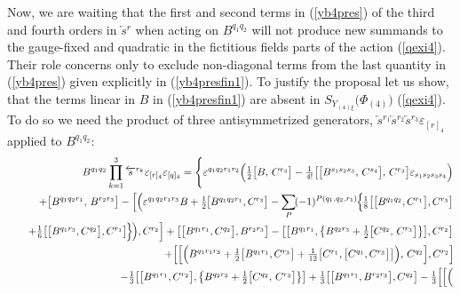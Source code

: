 \documentclass[10pt]{article}
\begin{document}
Now, we are waiting that the first and second terms  in (\ref{yb4pres}) of the  third and fourth orders in $\overleftarrow{s}{}^r$ when acting on $B^{q_1q_2}$  will not  produce new summands to the gauge-fixed  and quadratic in the fictitious fields parts of the action  (\ref{qexi4}). Their role concerns only to exclude non-diagonal terms from the   last quantity in (\ref{yb4pres}) given explicitly  in (\ref{yb4presfin1}).
To justify the proposal let us show, that the terms linear in $B$ in   (\ref{yb4presfin1}) are absent in $S_{Y_{(4)\xi}}\big({\Phi}_{(4)}\big)$ (\ref{qexi4}).
To do so we need  the product of three antisymmetrized generators, $\overleftarrow{s}{}^{r_1}\overleftarrow{s}{}^{r_2}\overleftarrow{s}{}^{r_3}\varepsilon_{[r]_4}$ applied to $B^{q_1q_2}$:
\begin{eqnarray}
&& B^{q_1q_2}\prod_{k=1}^{3} \overleftarrow{s}{}^{r_k}\varepsilon_{[r]_4}\varepsilon_{[q]_4} = \Bigg\{\varepsilon^{q_1q_2r_1r_2}\Big( \textstyle\frac{1}{2}\big[{B},\,C^{r_3}\big] - \frac{1}{4!}\big[\big[B^{s_1s_2s_3},\,C^{s_4}\big],\,C^{r_3}\big] \varepsilon_{s_1s_2s_3s_4}\Big) \nonumber \\
&& \quad +\big[B^{q_1q_2r_1},\,B^{r_2r_3}\big]- \Big[\Big(
\varepsilon^{q_1q_2r_1r_3}{B}+\textstyle\frac{1}{2}\hspace{-0.1em}\big[B^{q_1q_2r_1},C^{r_3}\big] - \displaystyle\sum_{P}\hspace{-0.15em}(-1)^{P(q_1,q_2,r_1)}\hspace{-0.1em}\Big\{\hspace{-0.1em}\textstyle\frac{1}{8}\big[\big[B^{q_1q_2},C^{r_1}\big],C^{r_3}\big] \nonumber \\
&& \quad +\textstyle\frac{1}{6} \big[\big[B^{q_1r_3},C^{q_2}\big],C^{r_1}\big] \hspace{-0.1em} \Big\} \hspace{-0.1em} \Big),C^{r_2}\Big]
+\big[\big[B^{q_1r_1},C^{q_2}\big],B^{r_2r_3}\big] -\big[\big[B^{q_1r_1}, \big\{B^{q_2r_3}+\frac{1}{2}\big[C^{q_2},\,C^{r_3}\big]\big\}\big],C^{r_2}\big] \nonumber \\
&& \quad +\Big[\Big[\Big(
  {B}^{q_1r_1r_3}+ \textstyle\frac{1}{2}
\big[B^{q_1r_1}, C^{r_3}\big]+\frac{1}{12}\big[C^{r_1},\big[C^{q_1},C^{r_3}\big]\big]\Big)
 ,\,C^{q_2}\Big],C^{r_2}\Big]
\hspace{-0.1em}  \nonumber \\
&& \quad   -\textstyle\frac{1}{3}\big[\big[B^{q_1r_1},C^{r_2}\big], \big\{B^{q_2r_3}+\frac{1}{2}\big[C^{q_2},\,C^{r_3}\big]\big\}\big]  +\textstyle\frac{1}{3}\big[\big[B^{q_1r_1},B^{r_2r_3}\big],C^{q_2}\big] -\textstyle\frac{1}{3}\Big[\Big[\Big(

\end{eqnarray}
\end{document}
